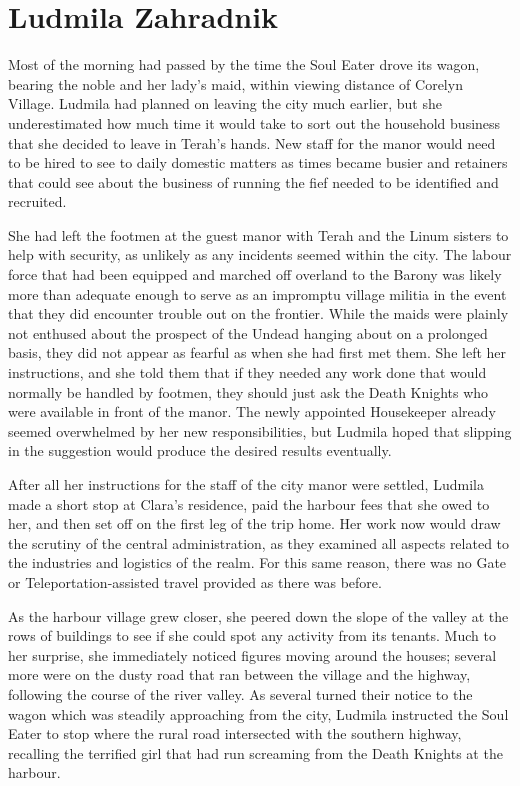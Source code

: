 \chapter{Ludmila Zahradnik}

Most of the morning had passed by the time the Soul Eater drove its wagon, bearing the noble and her lady’s maid, within viewing distance of Corelyn Village. Ludmila had planned on leaving the city much earlier, but she underestimated how much time it would take to sort out the household business that she decided to leave in Terah’s hands. New staff for the manor would need to be hired to see to daily domestic matters as times became busier and retainers that could see about the business of running the fief needed to be identified and recruited.

 

She had left the footmen at the guest manor with Terah and the Linum sisters to help with security, as unlikely as any incidents seemed within the city. The labour force that had been equipped and marched off overland to the Barony was likely more than adequate enough to serve as an impromptu village militia in the event that they did encounter trouble out on the frontier. While the maids were plainly not enthused about the prospect of the Undead hanging about on a prolonged basis, they did not appear as fearful as when she had first met them. She left her instructions, and she told them that if they needed any work done that would normally be handled by footmen, they should just ask the Death Knights who were available in front of the manor. The newly appointed Housekeeper already seemed overwhelmed by her new responsibilities, but Ludmila hoped that slipping in the suggestion would produce the desired results eventually.

 

After all her instructions for the staff of the city manor were settled, Ludmila made a short stop at Clara’s residence, paid the harbour fees that she owed to her, and then set off on the first leg of the trip home. Her work now would draw the scrutiny of the central administration, as they examined all aspects related to the industries and logistics of the realm. For this same reason, there was no Gate or Teleportation-assisted travel provided as there was before.

 

As the harbour village grew closer, she peered down the slope of the valley at the rows of buildings to see if she could spot any activity from its tenants. Much to her surprise, she immediately noticed figures moving around the houses; several more were on the dusty road that ran between the village and the highway, following the course of the river valley. As several turned their notice to the wagon which was steadily approaching from the city, Ludmila instructed the Soul Eater to stop where the rural road intersected with the southern highway, recalling the terrified girl that had run screaming from the Death Knights at the harbour.


